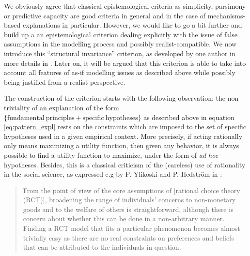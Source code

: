 \documentclass[a4paper,11pt]{article}
\theoremstyle{definition}
\begin{document}
{We obviously agree that classical epistemological criteria as simplicity, parsimony or predictive capacity are good criteria in general and in the case of mechanisms-based explanations in particular. However, we would like to go a bit further and build up a an epistemological criterion dealing explicitly with the issue of false assumptions in the modelling process and possibly realist-compatible. We now introduce this ``structural invariance'' criterion, as developed by one author in more details in \citep{attard_rationality}. Later on, it will be argued that this criterion is able to take into account all features of as-if modelling issues as described above while possibly being justified from a realist perspective.

The construction of the criterion starts with the following observation: the non triviality of an explanation of the form $\{\mathrm{fundamental~principles + specific~hypotheses}\}$ as described above in equation \eqref{eq:pattern_expl} rests on the constraints which are imposed to the set of specific hypotheses used in a given empirical context. More precisely, if acting rationally only means maximizing a utility function, then given any behavior, it is always possible to find a utility function to maximize, under the form of \textit{ad hoc} hypotheses. Besides, this is a classical criticism of the (careless) use of rationality in the social science, as expressed e.g by P. Ylikoski and P. Hedström in \citep[Chapter~2,~pp.~59-60]{Manzo2014}:
\begin{quote}
From the point of view of the core assumptions of [rational choice theory (RCT)], broadening the range of individuals’ concerns to non-monetary goods and to the welfare of others is straightforward, although there is concern about whether this can be done in a non-arbitrary manner. \textelp{} Finding a RCT model that fits a particular phenomenon becomes almost trivially easy as there are no real constraints on preferences and beliefs that can be attributed to the individuals in question.
\end{quote}

}
\end{document}
